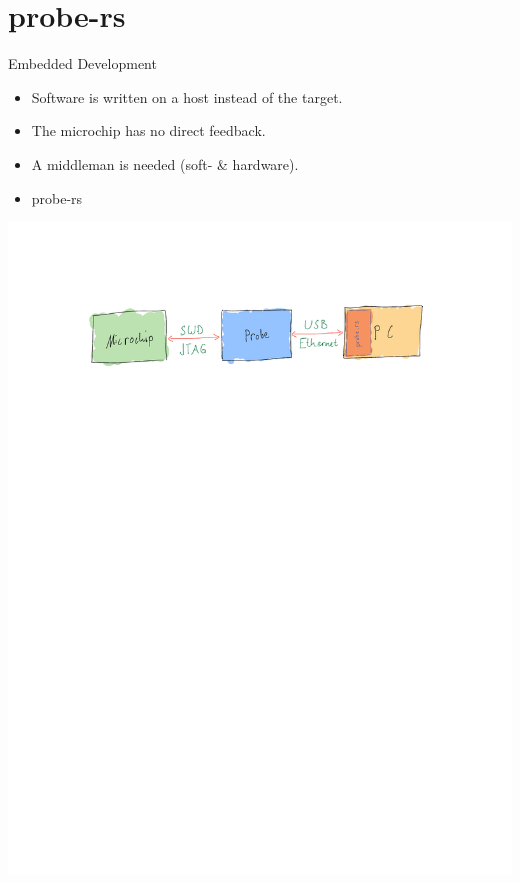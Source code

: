 \documentclass[aspectratio=1610,14pt,t]{beamer}
\begin{document}
\section{probe-rs}

\begin{frame}[c]{Embedded Development}
  \begin{itemize}
    \item Software is written on a host instead of the target.
    \item The microchip has no direct feedback.
    \item A middleman is needed (soft- \& hardware).
    \item probe-rs
  \end{itemize}
  \includegraphics[trim=2.5cm 0 0 2cm, clip, height=2.5\textheight]{./img/probe-chain.pdf}

\end{frame}
\end{document}
